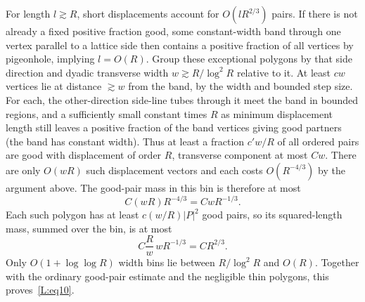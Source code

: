 For length \(l\gtrsim R\), short displacements account for \(O(lR^{2/3})\) pairs. If there is not already a fixed positive fraction good, some constant-width band through one vertex parallel to a lattice side then contains a positive fraction of all vertices by pigeonhole, implying \(l=O(R)\). Group these exceptional polygons by that side direction and dyadic transverse width \(w\gtrsim R/\log^2R\) relative to it. At least \(c w\) vertices lie at distance \(\gtrsim w\) from the band, by the width and bounded step size. For each, the other-direction side-line tubes through it meet the band in bounded regions, and a sufficiently small constant times \(R\) as minimum displacement length still leaves a positive fraction of the band vertices giving good partners (the band has constant width). Thus at least a fraction \(c' w/R\) of all ordered pairs are good with displacement of order \(R\), transverse component at most \(Cw\). There are only \(O(wR)\) such displacement vectors and each costs \(O(R^{-4/3})\) by the argument above. The good-pair mass in this bin is therefore at most
\[
 C(wR)R^{-4/3}=CwR^{-1/3}.
\]
Each such polygon has at least $c(w/R)|P|^2$ good pairs, so its
squared-length mass, summed over the bin, is at most
\[
 C\frac{R}{w}\,wR^{-1/3}=CR^{2/3}.
\]
Only $O(1+\log\log R)$ width bins lie between $R/\log^2R$ and $O(R)$.
Together with the ordinary good-pair estimate and the negligible thin
polygons, this proves~\eqref{L:eq10}.

